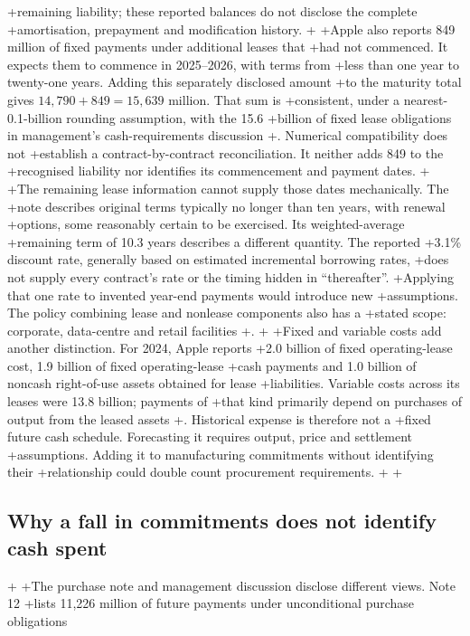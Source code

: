 +remaining liability; these reported balances do not disclose the complete
+amortisation, prepayment and modification history.
+
+Apple also reports 849 million of fixed payments under additional leases that
+had not commenced. It expects them to commence in 2025--2026, with terms from
+less than one year to twenty-one years. Adding this separately disclosed amount
+to the maturity total gives $14{,}790+849=15{,}639$ million. That sum is
+consistent, under a nearest-0.1-billion rounding assumption, with the 15.6
+billion of fixed lease obligations in management's cash-requirements discussion
+\citep[printed pp.~25 and 42]{apple2024}. Numerical compatibility does not
+establish a contract-by-contract reconciliation. It neither adds 849 to the
+recognised liability nor identifies its commencement and payment dates.
+
+The remaining lease information cannot supply those dates mechanically. The
+note describes original terms typically no longer than ten years, with renewal
+options, some reasonably certain to be exercised. Its weighted-average
+remaining term of 10.3 years describes a different quantity. The reported
+3.1\% discount rate, generally based on estimated incremental borrowing rates,
+does not supply every contract's rate or the timing hidden in ``thereafter''.
+Applying that one rate to invented year-end payments would introduce new
+assumptions. The policy combining lease and nonlease components also has a
+stated scope: corporate, data-centre and retail facilities
+\citep[Notes 1 and 8, printed pp.~34 and 42]{apple2024}.
+
+Fixed and variable costs add another distinction. For 2024, Apple reports
+2.0 billion of fixed operating-lease cost, 1.9 billion of fixed operating-lease
+cash payments and 1.0 billion of noncash right-of-use assets obtained for lease
+liabilities. Variable costs across its leases were 13.8 billion; payments of
+that kind primarily depend on purchases of output from the leased assets
+\citep[Note 8, printed p.~42]{apple2024}. Historical expense is therefore not a
+fixed future cash schedule. Forecasting it requires output, price and settlement
+assumptions. Adding it to manufacturing commitments without identifying their
+relationship could double count procurement requirements.
+
+\subsection{Why a fall in commitments does not identify cash spent}
+
+The purchase note and management discussion disclose different views. Note 12
+lists 11,226 million of future payments under unconditional purchase obligations
